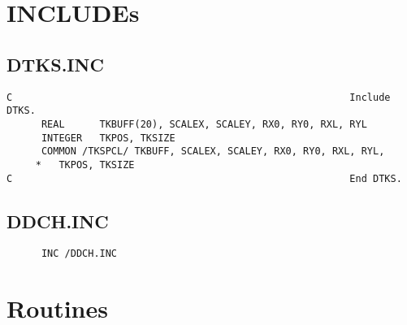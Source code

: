 \begin{verbatim}
\end{verbatim}

\section{INCLUDEs}
\subsection{DTKS.INC}

\begin{verbatim}
C                                                          Include DTKS.
      REAL      TKBUFF(20), SCALEX, SCALEY, RX0, RY0, RXL, RYL
      INTEGER   TKPOS, TKSIZE
      COMMON /TKSPCL/ TKBUFF, SCALEX, SCALEY, RX0, RY0, RXL, RYL,
     *   TKPOS, TKSIZE
C                                                          End DTKS.

\end{verbatim}
\subsection{DDCH.INC}

\begin{verbatim}
      INC /DDCH.INC

\end{verbatim}
\section{Routines}

